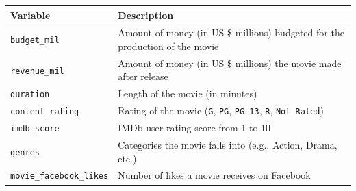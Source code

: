 \documentclass[
]{report}
\begin{document}
\begin{longtable}[]{@{}ll@{}}
\toprule
\begin{minipage}[b]{0.22\columnwidth}\raggedright
\textbf{Variable}\strut
\end{minipage} & \begin{minipage}[b]{0.72\columnwidth}\raggedright
\textbf{Description}\strut
\end{minipage}\tabularnewline
\midrule
\endhead
\begin{minipage}[t]{0.22\columnwidth}\raggedright
\texttt{budget\_mil}\strut
\end{minipage} & \begin{minipage}[t]{0.72\columnwidth}\raggedright
Amount of money (in US \$ millions) budgeted for the production of the movie\strut
\end{minipage}\tabularnewline
\begin{minipage}[t]{0.22\columnwidth}\raggedright
\texttt{revenue\_mil}\strut
\end{minipage} & \begin{minipage}[t]{0.72\columnwidth}\raggedright
Amount of money (in US \$ millions) the movie made after release\strut
\end{minipage}\tabularnewline
\begin{minipage}[t]{0.22\columnwidth}\raggedright
\texttt{duration}\strut
\end{minipage} & \begin{minipage}[t]{0.72\columnwidth}\raggedright
Length of the movie (in minutes)\strut
\end{minipage}\tabularnewline
\begin{minipage}[t]{0.22\columnwidth}\raggedright
\texttt{content\_rating}\strut
\end{minipage} & \begin{minipage}[t]{0.72\columnwidth}\raggedright
Rating of the movie (\texttt{G}, \texttt{PG}, \texttt{PG-13}, \texttt{R}, \texttt{Not\ Rated})\strut
\end{minipage}\tabularnewline
\begin{minipage}[t]{0.22\columnwidth}\raggedright
\texttt{imdb\_score}\strut
\end{minipage} & \begin{minipage}[t]{0.72\columnwidth}\raggedright
IMDb user rating score from 1 to 10\strut
\end{minipage}\tabularnewline
\begin{minipage}[t]{0.22\columnwidth}\raggedright
\texttt{genres}\strut
\end{minipage} & \begin{minipage}[t]{0.72\columnwidth}\raggedright
Categories the movie falls into (e.g., Action, Drama, etc.)\strut
\end{minipage}\tabularnewline
\begin{minipage}[t]{0.22\columnwidth}\raggedright
\texttt{movie\_facebook\_likes}\strut
\end{minipage} & \begin{minipage}[t]{0.72\columnwidth}\raggedright
Number of likes a movie receives on Facebook\strut
\end{minipage}\tabularnewline
\bottomrule
\end{longtable}
\end{document}
